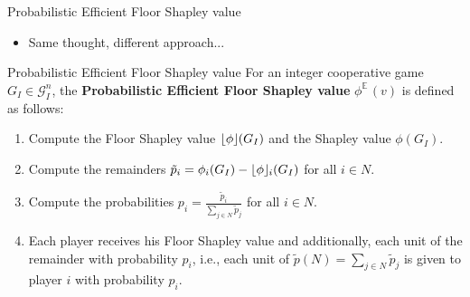 \documentclass{beamer}
\newcommand{\floor}[1]{\left\lfloor #1 \right\rfloor}
\newcommand{\floorphi}{\ensuremath{\floor{\phi}\hspace{-0.5ex}}}
\DeclareMathOperator{\E}{\mathbb{E}\,}
\begin{document}


\begin{frame}{Probabilistic Efficient Floor Shapley value}
    \begin{itemize}
        \item Same thought, different approach...
    \end{itemize}

    \begin{block}{Probabilistic Efficient Floor Shapley value}
        For an integer cooperative game $G_I \in \mathcal{G}_I^n$, the \textbf{Probabilistic Efficient Floor Shapley value} $\phi^{\E}(v)$ is defined as follows:
        \begin{enumerate}
            \item Compute the Floor Shapley value $\floorphi(G_I)$ and the Shapley value $\phi(G_I)$.
            \item Compute the remainders $\tilde{p}_i = \phi_i(G_I) - \floorphi_i(G_I)$ for all $i \in N$.
            \item Compute the probabilities $p_i = \frac{\tilde{p}_i}{\sum_{j \in N} \tilde{p}_j}$ for all $i \in N$.
            \item Each player receives his Floor Shapley value and additionally, each unit of the remainder with probability $p_i$, i.e., each unit of $\tilde{p}(N)=\sum_{j \in N} \tilde{p}_j$ is given to player $i$ with probability $p_i$.
        \end{enumerate}
    \end{block}
\end{frame}


\end{document}
